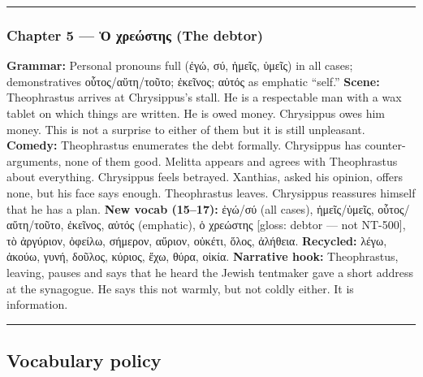 \documentclass[a4paper]{report}
\begin{document}
\begin{center}\rule{0.5\linewidth}{0.5pt}\end{center}

\subsubsection{Chapter 5 --- Ὁ χρεώστης (The
debtor)}\label{chapter-5-ux1f41-ux3c7ux3c1ux3b5ux3ceux3c3ux3c4ux3b7ux3c2-the-debtor}

\textbf{Grammar:} Personal pronouns full (ἐγώ, σύ, ἡμεῖς, ὑμεῖς) in all
cases; demonstratives οὗτος/αὕτη/τοῦτο; ἐκεῖνος; αὐτός as emphatic
``self.'' \textbf{Scene:} Theophrastus arrives at Chrysippus's stall. He
is a respectable man with a wax tablet on which things are written. He
is owed money. Chrysippus owes him money. This is not a surprise to
either of them but it is still unpleasant. \textbf{Comedy:} Theophrastus
enumerates the debt formally. Chrysippus has counter-arguments, none of
them good. Melitta appears and agrees with Theophrastus about
everything. Chrysippus feels betrayed. Xanthias, asked his opinion,
offers none, but his face says enough. Theophrastus leaves. Chrysippus
reassures himself that he has a plan. \textbf{New vocab (15--17):}
ἐγώ/σύ (all cases), ἡμεῖς/ὑμεῖς, οὗτος/αὕτη/τοῦτο, ἐκεῖνος, αὐτός
(emphatic), ὁ χρεώστης {[}gloss: debtor --- not NT-500{]}, τὸ ἀργύριον,
ὀφείλω, σήμερον, αὔριον, οὐκέτι, ὅλος, ἀλήθεια. \textbf{Recycled:} λέγω,
ἀκούω, γυνή, δοῦλος, κύριος, ἔχω, θύρα, οἰκία. \textbf{Narrative hook:}
Theophrastus, leaving, pauses and says that he heard the Jewish
tentmaker gave a short address at the synagogue. He says this not
warmly, but not coldly either. It is information.

\begin{center}\rule{0.5\linewidth}{0.5pt}\end{center}

\subsection{Vocabulary policy}\label{vocabulary-policy}
\end{document}
